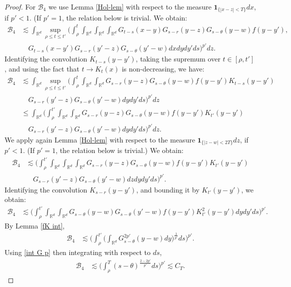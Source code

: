 \documentclass[12pt]{article}
\def\cB{\mathcal{B}}
\def\bR{\mathbb{R}}
\newcommand{\les}{\lesssim}
\begin{document}
\begin{proof}
For $\cB_4$ we use Lemma \ref{Hol-lem} with respect to the measure $\mathbf 1_{\{|x-z| < T\}}dx$, if $p'< 1$. (If $p'  = 1$, the relation below is trivial. We obtain: 
\begin{align*}
 \cB_4 & \les \int_{\bR^d} \sup_{\rho \leq t \leq t'}  \bigg(\int_\rho^t \int_{\bR^d} \int_{\bR^d} \int_{\bR^d} G_{t-s}(x-y)G_{s-r}(y-z)G_{s-\theta}(y-w) f(y-y'), \\
 & \quad G_{t-s}(x-y') G_{s-r}(y'-z)G_{s-\theta}(y'-w) dx dy dy' ds \bigg)^{p'} dz.
 \end{align*}
Identifying the convolution $K_{t-s}(y-y')$, taking the supremum over $t \in [\rho,t']$, and using the fact that $t \to K_t(x)$ is non-decreasing, we have:
\begin{align*}
 \cB_4 & \les \int_{\bR^d} \sup_{\rho \leq t \leq t'}  \bigg(\int_\rho^t \int_{\bR^d} \int_{\bR^d} G_{s-r}(y-z)G_{s-\theta}(y-w) f(y-y') K_{t-s}(y-y') \\
 & \quad G_{s-r}(y'-z)G_{s-\theta}(y'-w)  dy dy' ds \bigg)^{p'} dz \\
 & \leq \int_{\bR^d} \bigg(\int_\rho^{t'} \int_{\bR^d} \int_{\bR^d} G_{s-r}(y-z)G_{s-\theta}(y-w) f(y-y') K_{t'}(y-y') \\
 & \quad G_{s-r}(y'-z)G_{s-\theta}(y'-w)  dy dy' ds \bigg)^{p'} dz.
\end{align*}
We apply again Lemma \ref{Hol-lem} with respect to the measure $\mathbf 1_{\{|z-w| < 2T\}}dz$, if $p' < 1$. (If $p'=1$, the relation below is trivial.) We obtain:
\begin{align*}
 \cB_4 & \les \bigg(\int_\rho^{t'} \int_{\bR^d} \int_{\bR^d} \int_{\bR^d} G_{s-r}(y-z)G_{s-\theta}(y-w) f(y-y')  K_{t'}(y-y') \\
 & \quad G_{s-r}(y'-z)G_{s-\theta}(y'-w) dz dy dy' ds \bigg)^{p'}.
\end{align*}
Identifying the convolution $K_{s-r}(y-y')$, and bounding it by $K_{t'}(y-y')$, we obtain:
\begin{align*}
 \cB_4 & \les \bigg(\int_\rho^{t'} \int_{\bR^d} \int_{\bR^d} G_{s-\theta}(y-w) G_{s-\theta}(y'-w) f(y-y') K_{t'}^2(y-y')  dy dy' ds \bigg)^{p'}.
\end{align*}
By Lemma \ref{fK int},%
\begin{align*}
 \cB_4 & \les \bigg(\int_\rho^{t'} \bigg( \int_{\bR^d} G^{2p'}_{s-\theta}(y-w) dy \bigg)^{\frac{1}{p'}} ds\bigg)^{p'}.
\end{align*}
Using \eqref{int G p} then integrating with respect to $ds$,
\begin{align*}
 \cB_4 & \les \bigg(\int_\rho^{T} (s-\theta)^{\frac{2-2p'}{p'}} ds\bigg)^{p'} \les C_{T}.
\end{align*}


\end{proof}
\end{document}
